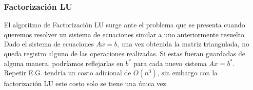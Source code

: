 \subsubsection{Factorización LU}
El algoritmo de Factorización LU surge ante el problema que se presenta cuando queremos resolver un sistema de ecuaciones similar a uno anteriormente resuelto. Dado el sistema de ecuaciones $Ax = b$, una vez obtenida la matriz triangulada, no queda registro alguno de las operaciones realizadas. Si estas fueran guardadas de alguna manera, podríamos reflejarlas en $b^{*}$  para cada nuevo sistema $Ax = b^{*}$. Repetir E.G. tendría un costo adicional de $O(n^{3})$, sin embargo con la factorización LU este costo solo se tiene una única vez.

